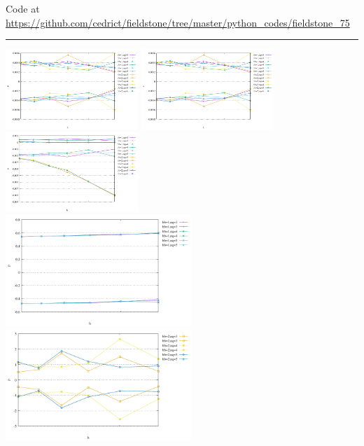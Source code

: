 

\begin{center}
Code at \url{https://github.com/cedrict/fieldstone/tree/master/python_codes/fieldstone_75}
\end{center}

\par\noindent\rule{\textwidth}{0.4pt}


\begin{center}
\includegraphics[width=5cm]{python_codes/fieldstone_75/results/u.pdf}
\includegraphics[width=5cm]{python_codes/fieldstone_75/results/v.pdf}
\includegraphics[width=5cm]{python_codes/fieldstone_75/results/w.pdf}\\
\includegraphics[width=7cm]{python_codes/fieldstone_75/results/p_b1.pdf}
\includegraphics[width=7cm]{python_codes/fieldstone_75/results/p_b2.pdf}\\

\end{center}
